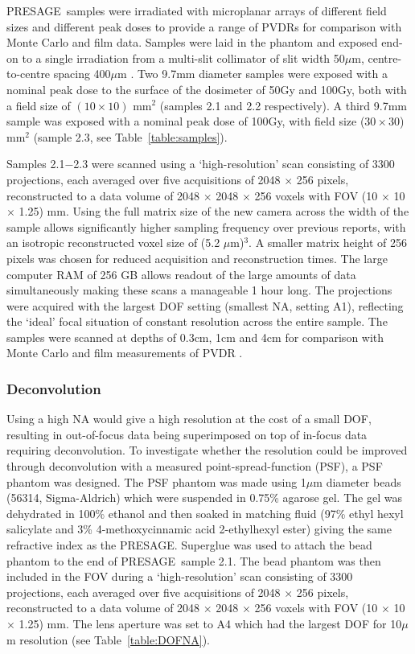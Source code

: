 	
	PRESAGE\textregistered \ samples were irradiated with microplanar arrays of different field sizes and different peak doses to provide a range of PVDRs for comparison with Monte Carlo and film data. Samples were laid in the phantom and exposed end-on to a single irradiation from a multi-slit collimator of slit width 50$\mu$m, centre-to-centre spacing 400$\mu$m \cite{brauer2009new}. Two 9.7mm diameter samples were exposed with a nominal peak dose to the surface of the dosimeter of 50Gy and 100Gy, both with a field size of $(10 \times 10)$ mm$^2$ (samples 2.1 and 2.2 respectively). A third 9.7mm sample was exposed with a nominal peak dose of 100Gy, with field size ($30 \times 30$) mm$^2$ (sample 2.3, see Table~\ref{table:samples}). 
	
	Samples 2.1−2.3 were scanned using a `high-resolution' scan consisting of 3300 projections, each averaged over five acquisitions of 2048 $\times$ 256 pixels, reconstructed to a data volume of 2048 $\times$ 2048 $\times$ 256 voxels with FOV (10 $\times$ 10 $\times$ 1.25) mm. Using the full matrix size of the new camera across the width of the sample allows significantly higher sampling frequency over previous reports, with an isotropic reconstructed voxel size of (5.2 $\mu$m)$^3$. A smaller matrix height of 256 pixels was chosen for reduced acquisition and reconstruction times. The large computer RAM of 256 GB allows readout of the large amounts of data simultaneously making these scans a manageable 1 hour long. The projections were acquired with the largest DOF setting (smallest NA, setting A1), reflecting the `ideal' focal situation of constant resolution across the entire sample. The samples were scanned at depths of 0.3cm, 1cm and 4cm for comparison with Monte Carlo and film measurements of PVDR \cite{martinez-roviradevelopment2012}. 
	
	\subsubsection{Deconvolution}
	Using a high NA would give a high resolution at the cost of a small DOF, resulting in out-of-focus data being superimposed on top of in-focus data requiring deconvolution. To investigate whether the resolution could be improved through deconvolution with a measured point-spread-function (PSF), a PSF phantom was designed. The PSF phantom was made using 1$\mu$m diameter beads (56314, Sigma-Aldrich) which were suspended in 0.75\% agarose gel. The gel was dehydrated in 100\% ethanol and then soaked in matching fluid (97\% ethyl hexyl salicylate and 3\% 4-methoxycinnamic acid 2-ethylhexyl ester) giving the same refractive index as the PRESAGE\textregistered. Superglue was used to attach the bead phantom to the end of PRESAGE\textregistered \ sample 2.1. The bead phantom was then included in the FOV during a `high-resolution' scan consisting of 3300 projections, each averaged over five acquisitions of 2048 $\times$ 256 pixels, reconstructed to a data volume of 2048 $\times$ 2048 $\times$ 256 voxels with FOV (10 $\times$ 10 $\times$ 1.25) mm. The lens aperture was set to A4  which had the largest DOF for 10$\mu$m resolution (see Table~\ref{table:DOFNA}). 
	

